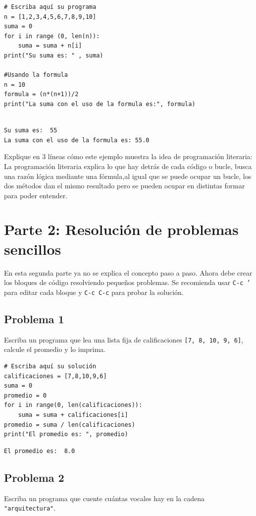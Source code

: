 \documentclass{article}
\begin{document}
\begin{verbatim}
# Escriba aquí su programa
n = [1,2,3,4,5,6,7,8,9,10]
suma = 0
for i in range (0, len(n)):
    suma = suma + n[i]
print("Su suma es: " , suma)

#Usando la formula
n = 10
formula = (n*(n+1))/2
print("La suma con el uso de la formula es:", formula)
    
\end{verbatim}

\begin{verbatim}
Su suma es:  55
La suma con el uso de la formula es: 55.0
\end{verbatim}


Explique en 3 líneas cómo este ejemplo muestra la idea de programación literaria:
La programación literaria explica lo que hay detrás de cada código o bucle, busca
una razón lógica mediante una fórmula,al igual que se puede ocupar un bucle, los dos
métodos dan el mismo resultado pero se pueden ocupar en distintas formar para poder entender.
\section{Parte 2: Resolución de problemas sencillos}
\label{sec:orgc713ec2}
En esta segunda parte ya no se explica el concepto paso a paso. Ahora debe crear los bloques de código resolviendo pequeños problemas. Se recomienda usar \texttt{C-c '} para editar cada bloque y \texttt{C-c C-c} para probar la solución.

\subsection{Problema 1}
\label{sec:org444c9f8}
Escriba un programa que lea una lista fija de calificaciones \texttt{[7, 8, 10, 9, 6]}, calcule el promedio y lo imprima.

\begin{verbatim}
# Escriba aquí su solución
calificaciones = [7,8,10,9,6]
suma = 0
promedio = 0
for i in range(0, len(calificaciones)):
    suma = suma + calificaciones[i]
promedio = suma / len(calificaciones)
print("El promedio es: ", promedio)

\end{verbatim}

\begin{verbatim}
El promedio es:  8.0
\end{verbatim}

\subsection{Problema 2}
\label{sec:org7039cea}
Escriba un programa que cuente cuántas vocales hay en la cadena \texttt{"arquitectura"}.
\end{document}

